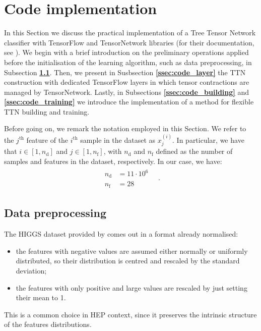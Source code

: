 \documentclass[../main/main.tex]{subfiles}
\begin{document}
\section{Code implementation}
\label{sec:code}
In this Section we discuss the practical implementation of a Tree Tensor Network classifier with TensorFlow and TensorNetwork libraries (for their documentation, see \cite{tf, tn}). We begin with a brief introduction on the preliminary operations applied before the initialisation of the learning algorithm, such as data preprocessing, in Subsection \textbf{\ref{ssec:code_preprocessing}}. Then, we present in Susbsection \textbf{\ref{ssec:code_layer}} the TTN construction with dedicated TensorFlow layers in which tensor contractions are managed by TensorNetwork. Lastly, in Subsections \textbf{\ref{ssec:code_building}} and \textbf{\ref{ssec:code_training}} we introduce the implementation of a method for flexible TTN building and training.

Before going on, we remark the notation employed in this Section. We refer to the \( j^{\text{th}} \) feature of the \( i^{\text{th}} \) sample in the dataset as \( x^{(i)}_{j} \). In particular, we have that \( i \in [1,n_{\mathrm{d}}] \) and \( j \in [1,n_{\mathrm{f}}] \), with \( n_{\mathrm{d}} \) and \( n_{\mathrm{f}} \) defined as the number of samples and features in the dataset, respectively. In our case, we have:
\begin{align}
    \begin{aligned}
        n_{\mathrm{d}} &= 11 \cdot 10^{6}   \\
        n_{\mathrm{f}} &= 28
    \end{aligned}
    \quad .
\end{align}

\renewcommand{\lstlistingname}{\textbf{LST.}}
\renewcommand{\thelstlisting}{\textbf{\arabic{lstlisting}}}



\subsection{Data preprocessing}
\label{ssec:code_preprocessing}
The HIGGS dataset provided by \cite{baldi} comes out in a format already normalised:
\begin{itemize}
    \item the features with negative values are assumed either normally or uniformly distributed, so their distribution is centred and rescaled by the standard deviation;
    \item the features with only positive and large values are rescaled by just setting their mean to 1.
\end{itemize}
This is a common choice in HEP context, since it preserves the intrinsic structure of the features distributions.
\end{document}
